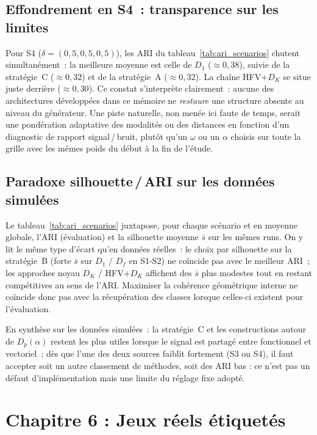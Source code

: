\documentclass[11pt,a4paper]{article}
\newcommand{\DK}{D_K}
\newcommand{\Dp}{D_p}
\begin{document}
\subsection{Effondrement en S4~: transparence sur les limites}

Pour S4 ($\delta = (0{,}5, 0{,}5, 0{,}5)$), les ARI du
tableau~\ref{tab:ari_scenarios} chutent simultanément~: la meilleure moyenne
est celle de $D_1$ ($\approx 0{,}38$), suivie de la stratégie~C ($\approx
0{,}32$) et de la stratégie~A ($\approx 0{,}32$). La chaîne HFV$+\DK$ se situe
juste derrière ($\approx 0{,}30$). Ce constat s'interprète clairement~: aucune
des architectures développées dans ce mémoire ne \emph{restaure} une structure absente au niveau du
générateur. Une piste naturelle, non menée ici faute de temps, serait une
pondération adaptative des modalités ou des distances en fonction d'un diagnostic
de rapport signal\,/\,bruit, plutôt qu'un $\omega$ ou un $\alpha$ choisis sur
toute la grille avec les mêmes poids du début à la fin de l'étude.

\subsection{Paradoxe silhouette\,/\,ARI sur les données simulées}
Le tableau~\ref{tab:ari_scenarios} juxtapose, pour chaque scénario et en moyenne
globale, l'ARI (évaluation) et la silhouette moyenne $\bar{s}$ sur les mêmes
runs. On y lit le même type d'écart qu'en données réelles~: le choix par
silhouette sur la stratégie~B (forte $\bar{s}$ sur $D_1$ / $D_f$ en S1-S2) ne
coïncide pas avec le meilleur ARI~; les approches noyau $\DK$ / HFV$+\DK$
affichent des $\bar{s}$ plus modestes tout en restant compétitives au sens de
l'ARI. Maximiser la cohérence géométrique interne ne coïncide donc pas avec la
récupération des classes lorsque celles-ci existent pour l'évaluation.

\medskip
\noindent
En synthèse sur les données simulées~: la stratégie~C et les constructions autour de
$\Dp(\alpha)$ restent les plus utiles lorsque le signal est partagé entre
fonctionnel et vectoriel~; dès que l'une des deux sources faiblit fortement (S3
ou S4), il faut accepter soit un autre classement de méthodes, soit des ARI
bas : ce n'est pas un défaut d'implémentation mais une limite du réglage
fixe adopté.

\section{Chapitre 6 : Jeux réels étiquetés}
\end{document}
